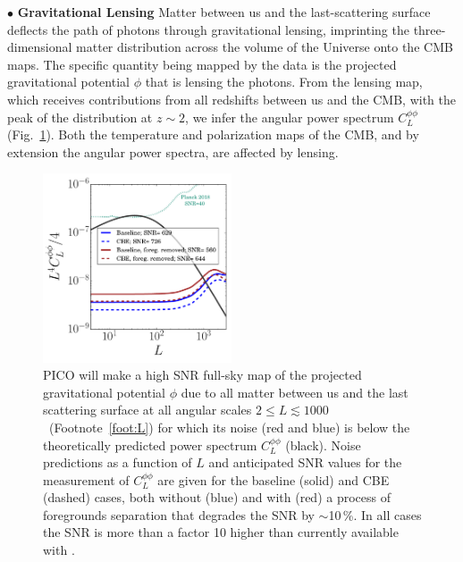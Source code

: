 \documentclass[PICOReport.tex]{subfiles}
\begin{document}
\noindent$\bullet$ {\bf Gravitational Lensing} \hspace{0.1in} \label{lensing} Matter between us and the last-scattering surface deflects the path of photons through gravitational lensing, imprinting the three-dimensional matter distribution across the volume of the Universe onto the CMB maps. The specific quantity being mapped by the data is the projected gravitational potential $\phi$ that is lensing the photons. From the lensing map, which receives contributions from all redshifts between us and the CMB, with the peak of the distribution at $z \sim 2$, we infer the angular power spectrum $C_{L}^{\phi \phi}$ (Fig.~\ref{fig:lensingNoisePICO}). Both the temperature and polarization maps of the CMB, and by extension the angular power spectra, are affected by lensing. 
\begin{figure}[h]
\hspace{-0.2in}
\parbox{3.0in}{\centerline {
\includegraphics[width=2.2in]{images/lensingNoisePICO_w_planck.pdf} } }
\hspace{0.in}
\parbox{3.3in}{
\caption{\captiontext 
PICO will make a high \ac{SNR} full-sky map of the projected gravitational potential $\phi$ due to all matter between us and the last scattering surface at all angular scales $2 \leq L \lesssim 1000$~(Footnote~\ref{foot:L}) for which its noise (red and blue) is below the 
theoretically predicted power spectrum $C_{L}^{\phi \phi}$ (black). Noise predictions as a function of $L$ and anticipated \ac{SNR} values for the measurement of  $C_{L}^{\phi \phi}$ are given for the baseline (solid) and CBE (dashed) cases, both without (blue) and with (red) a process of foregrounds separation that degrades the \ac{SNR} by $\sim$10\,\%.  In all cases the \ac{SNR} is more than a factor 10 higher than currently available with \planck .
\label{fig:lensingNoisePICO} } }
\vspace{-0.1in}
\end{figure}
\end{document}
